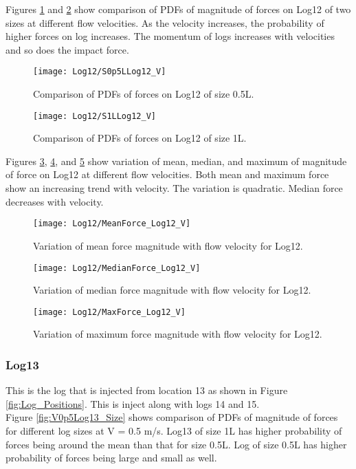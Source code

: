 \noindent Figures \ref{fig:S0p5LLog12_V} and \ref{fig:S1LLog12_V} show comparison of PDFs of magnitude of forces on Log12 of two sizes at different flow velocities. As the velocity increases, the probability of higher forces on log increases. The momentum of logs increases with velocities and so does the impact force.

\begin{figure}
\centering
\texttt{[image: Log12/S0p5LLog12\_V]}
\caption{\label{fig:S0p5LLog12_V}Comparison of PDFs of forces on Log12 of size 0.5L.}
\end{figure}
\begin{figure}
\centering
\texttt{[image: Log12/S1LLog12\_V]}
\caption{\label{fig:S1LLog12_V}Comparison of PDFs of forces on Log12 of size 1L.}
\end{figure}

\noindent Figures \ref{fig:MeanForce_Log12_V}, \ref{fig:MedianForce_Log12_V}, and \ref{fig:MaxForce_Log12_V} show variation of mean, median, and maximum of magnitude of force on Log12 at different flow velocities. Both mean and maximum force show an increasing trend with velocity. The variation is quadratic. Median force decreases with velocity.

\begin{figure}
\centering
\texttt{[image: Log12/MeanForce\_Log12\_V]}
\caption{\label{fig:MeanForce_Log12_V}Variation of mean force magnitude with flow velocity for Log12.}
\end{figure}
\begin{figure}
\centering
\texttt{[image: Log12/MedianForce\_Log12\_V]}
\caption{\label{fig:MedianForce_Log12_V}Variation of median force magnitude with flow velocity for Log12.}
\end{figure}
\begin{figure}
\centering
\texttt{[image: Log12/MaxForce\_Log12\_V]}
\caption{\label{fig:MaxForce_Log12_V}Variation of maximum force magnitude with flow velocity for Log12.}
\end{figure}

\FloatBarrier
\subsubsection{Log13}
This is the log that is injected from location 13 as shown in Figure \ref{fig:Log_Positions}. This is inject along with logs 14 and 15.\\ 
Figure \ref{fig:V0p5Log13_Size} shows comparison of PDFs of magnitude of forces for different log sizes at V = 0.5 m/s. Log13 of size 1L has higher probability of forces being around the mean than that for size 0.5L. Log of size 0.5L has higher probability of forces being large and small as well.

